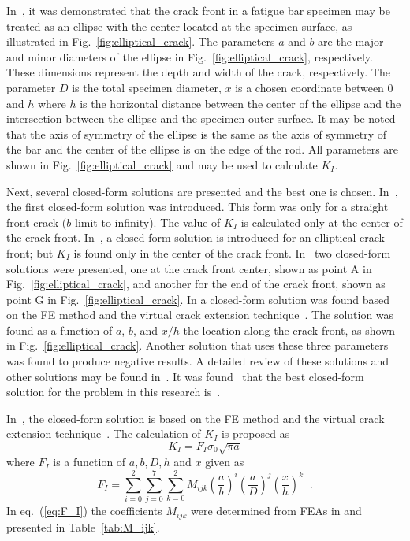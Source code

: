 \documentclass{ieeeaccess}
\begin{document}
In~\cite{toribio2009automated}, it was demonstrated that the crack front in a fatigue bar specimen may be treated as an ellipse with the center located at the specimen surface, as illustrated in Fig.~\ref{fig:elliptical_crack}. The parameters $a$ and $b$ are the major and minor diameters of the ellipse in Fig.~\ref{fig:elliptical_crack}, respectively. These dimensions represent the depth and width of the crack, respectively. The parameter $D$ is the total specimen diameter, $x$ is a chosen coordinate between 0 and $h$ where $h$ is the horizontal distance between the center of the ellipse and the intersection between the ellipse and the specimen outer surface. It may be noted that the axis of symmetry of the ellipse is the same as the axis of symmetry of the bar and the center of the ellipse is on the edge of the rod. All parameters are shown in Fig.~\ref{fig:elliptical_crack} and may be used to calculate $K_I$.

Next, several closed-form solutions are presented and the best one is chosen. In~\cite{valiente1980criterios}, the first closed-form solution was introduced. This form was only for a straight front crack ($b$ limit to infinity). The value of $K_I$ is calculated only at the center of the crack front. 
In~\cite{astiz1986incompatible}, a closed-form solution is introduced for an elliptical crack front; but $K_I$ is found only in the center of the crack front. In~\cite{couroneau1998simplified,carpinteri1992elliptical} two closed-form solutions were presented, one at the crack front center, shown as point A in Fig.~\ref{fig:elliptical_crack}, and another for the end of the crack front, shown as point G in Fig.~\ref{fig:elliptical_crack}. In \cite{shin2004experimental} a closed-form solution was found based on the FE method and the virtual crack extension technique~\cite{hellen1975method}. The solution was found as a function of $a$, $b$, and $x/h$ the location along the crack front, as shown in Fig.~\ref{fig:elliptical_crack}.
Another solution that uses these three parameters~\cite{shih2002stress} was found to produce negative results. A detailed review of these solutions and other solutions may be found in~\cite{toribio2009automated}.
It was found~\cite{toribio2009automated} that the best closed-form solution for the problem in this research is~\cite{shih2002stress}.


In~\cite{shin2004experimental}, the closed-form solution is based on the FE method and the virtual crack extension technique~\cite{hellen1975method}.  The calculation of \(K_I\) is proposed as
%
\begin{equation}
\label{eq:K_I__F_I}
K_{I}=F_I \sigma_0 \sqrt{\pi a}
\end{equation}
%
where $F_I$ is a function of $a, b, D, h$ and $x$ given as
%
\begin{equation}
\label{eq:F_I}
F_{I}=\sum^{2}_{i=0} \sum^{7}_{j=0}\sum^{2}_{k=0} M_{ijk}\left(\frac{a}{b}\right)^i  \left(\frac{a}{D}\right)^j  \left(\frac{x}{h}\right)^k\;\;.
\end{equation}
In eq.~(\ref{eq:F_I}) the coefficients $M_{ijk}$ were determined from FEAs in \cite{shin2004experimental} and presented in Table~\ref{tab:M_ijk}.
\end{document}
